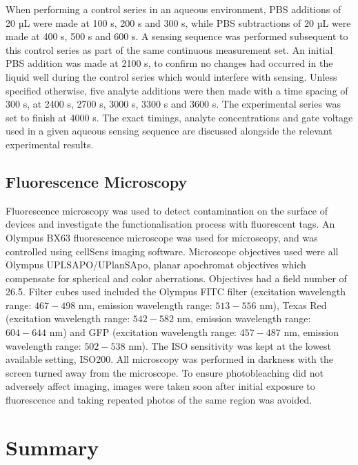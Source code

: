 \documentclass[
  a4paper,
]{scrbook}
\begin{document}
When performing a control series in an aqueous environment, PBS
additions of 20 µL were made at 100 s, 200 s and 300 s, while PBS
subtractions of 20 µL were made at 400 s, 500 s and 600 s. A sensing
sequence was performed subsequent to this control series as part of the
same continuous measurement set. An initial PBS addition was made at
2100 s, to confirm no changes had occurred in the liquid well during the
control series which would interfere with sensing. Unless specified
otherwise, five analyte additions were then made with a time spacing of
300 s, at 2400 s, 2700 s, 3000 s, 3300 s and 3600 s. The experimental
series was set to finish at 4000 s. The exact timings, analyte
concentrations and gate voltage used in a given aqueous sensing sequence
are discussed alongside the relevant experimental results.

\hypertarget{sec-fluorescence-characterisation}{%
\subsection{Fluorescence
Microscopy}\label{sec-fluorescence-characterisation}}

Fluorescence microscopy was used to detect contamination on the surface
of devices and investigate the functionalisation process with
fluorescent tags. An Olympus BX63 fluorescence microscope was used for
microscopy, and was controlled using cellSens imaging software.
Microscope objectives used were all Olympus UPLSAPO/UPlanSApo, planar
apochromat objectives which compensate for spherical and color
aberrations. Objectives had a field number of 26.5. Filter cubes used
included the Olympus FITC filter (excitation wavelength range:
\(467-498\) nm, emission wavelength range: \(513-556\) nm), Texas Red
(excitation wavelength range: \(542-582\) nm, emission wavelength range:
\(604-644\) nm) and GFP (excitation wavelength range: \(457-487\) nm,
emission wavelength range: \(502-538\) nm). The ISO sensitivity was kept
at the lowest available setting, ISO200. All microscopy was performed in
darkness with the screen turned away from the microscope. To ensure
photobleaching did not adversely affect imaging, images were taken soon
after initial exposure to fluorescence and taking repeated photos of the
same region was avoided.

\hypertarget{summary-2}{%
\section{Summary}\label{summary-2}}
\end{document}
